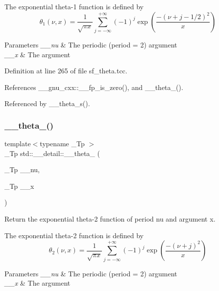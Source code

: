 The exponential theta-\/1 function is defined by \[ \theta_1(\nu,x) = \frac{1}{\sqrt{\pi x}} \sum_{j=-\infty}^{+\infty} (-1)^j \exp\left( \frac{-(\nu + j - 1/2)^2}{x} \right) \]


\begin{DoxyParams}{Parameters}
{\em \+\_\+\+\_\+nu} & The periodic (period = 2) argument \\
\hline
{\em \+\_\+\+\_\+x} & The argument \\
\hline
\end{DoxyParams}


Definition at line 265 of file sf\+\_\+theta.\+tcc.



References \+\_\+\+\_\+gnu\+\_\+cxx\+::\+\_\+\+\_\+fp\+\_\+is\+\_\+zero(), and \+\_\+\+\_\+theta\+\_().



Referenced by \+\_\+\+\_\+theta\+\_\+s().

\mbox{\label{namespacestd_1_1____detail_ae783991fe49b94dff4ac9e3ebb446d4f}} 
\subsubsection{\texorpdfstring{\+\_\+\+\_\+theta\+\_()}{\_\_theta\_2()}}
{\footnotesize\ttfamily template$<$typename \+\_\+\+Tp $>$ \\
\+\_\+\+Tp std\+::\+\_\+\+\_\+detail\+::\+\_\+\+\_\+theta\+\_ (\begin{DoxyParamCaption}\item[{\+\_\+\+Tp}]{\+\_\+\+\_\+nu,  }\item[{\+\_\+\+Tp}]{\+\_\+\+\_\+x }\end{DoxyParamCaption})}

Return the exponential theta-\/2 function of period {\ttfamily nu} and argument {\ttfamily x}.

The exponential theta-\/2 function is defined by \[ \theta_2(\nu,x) = \frac{1}{\sqrt{\pi x}} \sum_{j=-\infty}^{+\infty} (-1)^j \exp\left( \frac{-(\nu + j)^2}{x} \right) \]


\begin{DoxyParams}{Parameters}
{\em \+\_\+\+\_\+nu} & The periodic (period = 2) argument \\
\hline
{\em \+\_\+\+\_\+x} & The argument \\
\hline
\end{DoxyParams}


